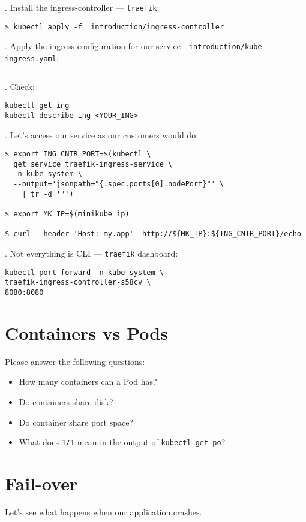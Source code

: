 \documentclass[12pt, letterpaper]{article}
\begin{document}
. Install the ingress-controller --- \verb|traefik|:

\begin{verbatim}
$ kubectl apply -f  introduction/ingress-controller
\end{verbatim}

. Apply the ingress configuration for our service - \verb|introduction/kube-ingress.yaml|:
\inputminted{yaml}{introduction/kube-ingress.yaml}

. Check:

\begin{verbatim}
kubectl get ing
kubectl describe ing <YOUR_ING>
\end{verbatim}

. Let's access our service as our customers would do:

\begin{verbatim}
$ export ING_CNTR_PORT=$(kubectl \
  get service traefik-ingress-service \
  -n kube-system \
  --output='jsonpath="{.spec.ports[0].nodePort}"' \
    | tr -d '"')

$ export MK_IP=$(minikube ip)

$ curl --header 'Host: my.app'  http://${MK_IP}:${ING_CNTR_PORT}/echo

\end{verbatim}

. Not everything is CLI --- \verb|traefik| dashboard:

\begin{verbatim}
kubectl port-forward -n kube-system \
traefik-ingress-controller-s58cv \
8080:8080
\end{verbatim}

\section{Containers vs Pods}
Please answer the following questions:
\begin{itemize}
\item How many containers can a Pod has?
\item Do containers share disk?
\item Do container share port space?
\item What does \verb|1/1| mean in the output of \verb|kubectl get po|?
\end{itemize}

\bigskip
\bigskip

\section{Fail-over}
Let's see what happens when our application crashes.
\end{document}
